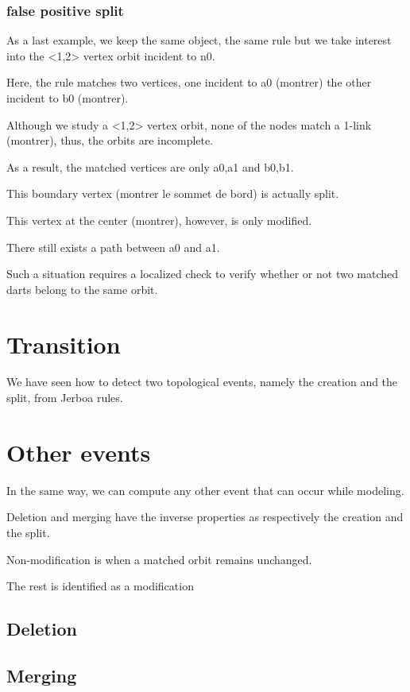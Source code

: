 \documentclass[11pt]{article}
\begin{document}
\subsubsection{false positive split}
\label{sec:org280c9af}
As a last example, we keep the same object, the same rule but we take interest
into the <1,2> vertex orbit incident to n0.

Here, the rule matches two vertices, one incident to a0 (montrer) the other
incident to b0 (montrer).

Although we study a <1,2> vertex orbit, none of the nodes match a 1-link
(montrer), thus, the orbits are incomplete.

As a result, the matched vertices are only a0,a1 and b0,b1.

This boundary vertex (montrer le sommet de bord) is actually split.

This vertex at the center (montrer), however, is only modified.

There still exists a path between a0 and a1.

Such a situation requires a localized check to verify whether or not two matched
darts belong to the same orbit.

\section{Transition}
\label{sec:org979ae36}

We have seen how to detect two topological events, namely the creation and the
split, from Jerboa rules.

\section{Other events}
\label{sec:orgf3b8840}
In the same way, we can compute any other event that can occur while modeling.

Deletion and merging have the inverse properties as respectively the creation
and the split.

Non-modification is when a matched orbit remains unchanged.

The rest is identified as a modification

\subsection{Deletion}
\label{sec:org430804f}
\subsection{Merging}
\label{sec:org4bb5efa}
\end{document}
